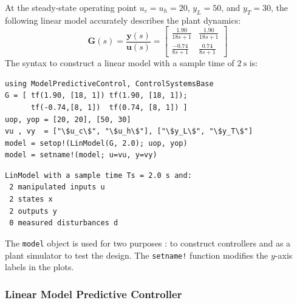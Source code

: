 At the steady-state operating point $u_c=u_h=20$, $y_L=50$, and $y_T=30$, the following linear model accurately describes the plant dynamics:
\begin{equation}
\mathbf{G}(s) = \frac{\mathbf{y}(s)}{\mathbf{u}(s)} =
\begin{bmatrix}
    \frac{1.90}{18s+1} & \frac{1.90}{18s+1} \\[3pt]
    \frac{-0.74}{8s+1} & \frac{0.74}{8s+1}
\end{bmatrix}
\end{equation}
The syntax to construct a linear model with a sample time of $\SI{2}{\second}$ is:
\begin{verbatim}
using ModelPredictiveControl, ControlSystemsBase
G = [ tf(1.90, [18, 1]) tf(1.90, [18, 1]);
      tf(-0.74,[8, 1])  tf(0.74, [8, 1]) ]
uop, yop = [20, 20], [50, 30]
vu , vy  = ["\$u_c\$", "\$u_h\$"], ["\$y_L\$", "\$y_T\$"]
model = setop!(LinModel(G, 2.0); uop, yop)
model = setname!(model; u=vu, y=vy)
\end{verbatim}
\spacerepl\vspace{0.5em}
\begin{verbatim}
LinModel with a sample time Ts = 2.0 s and:
 2 manipulated inputs u
 2 states x
 2 outputs y
 0 measured disturbances d
\end{verbatim}
The \texttt{model} object is used for two purposes : to construct controllers and as a plant simulator to test the design. The \texttt{setname!} function modifies the $y$-axis labels in the plots.

\subsubsection{Linear Model Predictive Controller}

